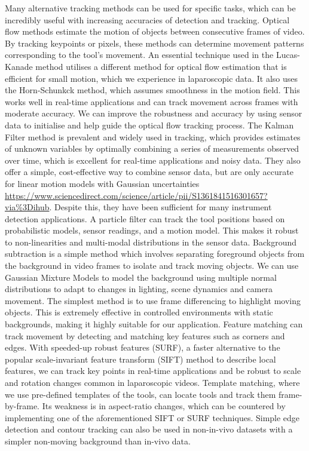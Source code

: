Many alternative tracking methods can be used for specific tasks, which can be incredibly useful with increasing accuracies of detection and tracking. Optical flow methods estimate the motion of objects between consecutive frames of video. By tracking keypoints or pixels, these methods can determine movement patterns corresponding to the tool's movement. An essential technique used in the Lucas-Kanade method utilises a different method for optical flow estimation that is efficient for small motion, which we experience in laparoscopic data. It also uses the Horn-Schunkck method, which assumes smoothness in the motion field. This works well in real-time applications and can track movement across frames with moderate accuracy. We can improve the robustness and accuracy by using sensor data to initialise and help guide the optical flow tracking process. The Kalman Filter method is prevalent and widely used in tracking, which provides estimates of unknown variables by optimally combining a series of measurements observed over time, which is excellent for real-time applications and noisy data. They also offer a simple, cost-effective way to combine sensor data, but are only accurate for linear motion models with Gaussian uncertainties \url{https://www.sciencedirect.com/science/article/pii/S1361841516301657?via%3Dihub}. Despite this, they have been sufficient for many instrument detection applications. A particle filter can track the tool positions based on probabilistic models, sensor readings, and a motion model. This makes it robust to non-linearities and multi-modal distributions in the sensor data. Background subtraction is a simple method which involves separating foreground objects from the background in video frames to isolate and track moving objects. We can use Gaussian Mixture Models to model the background using multiple normal distributions to adapt to changes in lighting, scene dynamics and camera movement. The simplest method is to use frame differencing to highlight moving objects. This is extremely effective in controlled environments with static backgrounds, making it highly suitable for our application. Feature matching can track movement by detecting and matching key features such as corners and edges. With speeded-up robust features (SURF), a faster alternative to the popular scale-invariant feature transform (SIFT) method to describe local features, we can track key points in real-time applications and be robust to scale and rotation changes common in laparoscopic videos. Template matching, where we use pre-defined templates of the tools, can locate tools and track them frame-by-frame. Its weakness is in aspect-ratio changes, which can be countered by implementing one of the aforementioned SIFT or SURF techniques. Simple edge detection and contour tracking can also be used in non-in-vivo datasets with a simpler non-moving background than in-vivo data.


